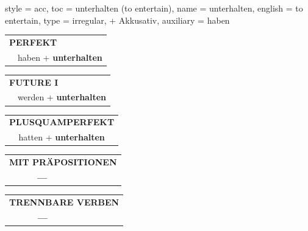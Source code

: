 \begin{verbentry}{
  style = {acc},
  toc = {unterhalten (to entertain)},
  name = {unterhalten},
  english = {to entertain},
  type = {irregular, + Akkusativ},
  auxiliary = {haben}
}
\vspace{10pt}

\begin{tabular}{rl}
\multicolumn{2}{l}{\textbf{PERFEKT}}\\
& haben + \textbf{unterhalten}\\
\end{tabular}
\hfill
\begin{tabular}{rl}
\multicolumn{2}{l}{\textbf{FUTURE I}}\\
& werden + \textbf{unterhalten}\\
\end{tabular}
\hfill
\begin{tabular}{rl}
\multicolumn{2}{l}{\textbf{PLUSQUAMPERFEKT}}\\
& hatten + \textbf{unterhalten}\\
\end{tabular}

\vspace{10pt}

\begin{tabular}{lll}
\multicolumn{3}{l}{\textbf{MIT PRÄPOSITIONEN}}\\
& \textbf{---} & \\
\end{tabular}
\hfill
\begin{tabular}{lll}
\multicolumn{3}{l}{\textbf{TRENNBARE VERBEN}}\\
& \textbf{---} & \\
\end{tabular}

\vspace{-5pt}
\end{verbentry}

